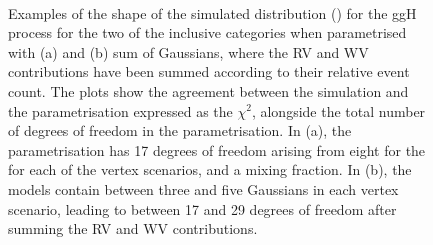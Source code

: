 \ifNewAnalysis
\begin{figure}[htp!]
\centering
 \\
\caption{Examples of the shape of the simulated \mgg distribution (\GeV) for the ggH process for the two of the inclusive categories when parametrised with (a) \DCBpG and (b) sum of Gaussians, where the RV and WV contributions have been summed according to their relative event count. The plots show the agreement between the simulation and the parametrisation expressed as the $\chi^2$, alongside the total number of degrees of freedom in the parametrisation. In (a), the parametrisation has 17 degrees of freedom arising from eight for the \DCBpG for each of the vertex scenarios, and a mixing fraction. In (b), the models contain between three and five Gaussians in each vertex scenario, leading to between 17 and 29 degrees of freedom after summing the RV and WV contributions.}

\label{fig:model:functionalform}
\end{figure}
\else
